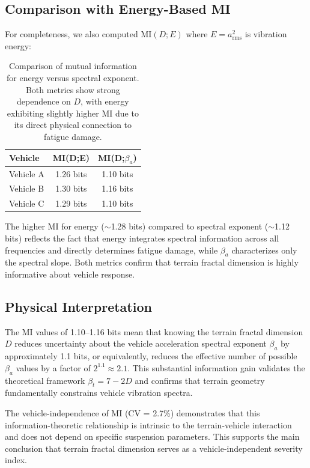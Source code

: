 \documentclass[11pt,letterpaper]{article}
\begin{document}
\subsection{Comparison with Energy-Based MI}

For completeness, we also computed $\text{MI}(D;E)$ where $E = a_{\text{rms}}^2$ is vibration energy:

\begin{table}[h]
\centering
\begin{tabular}{lcc}
\hline
\textbf{Vehicle} & \textbf{MI(D;E)} & \textbf{MI(D;$\beta_a$)} \\
\hline
Vehicle A & 1.26 bits & 1.10 bits \\
Vehicle B & 1.30 bits & 1.16 bits \\
Vehicle C & 1.29 bits & 1.10 bits \\
\hline
\end{tabular}
\caption{Comparison of mutual information for energy versus spectral exponent. Both metrics show strong dependence on $D$, with energy exhibiting slightly higher MI due to its direct physical connection to fatigue damage.}
\end{table}

The higher MI for energy ($\sim$1.28 bits) compared to spectral exponent ($\sim$1.12 bits) reflects the fact that energy integrates spectral information across all frequencies and directly determines fatigue damage, while $\beta_a$ characterizes only the spectral slope. Both metrics confirm that terrain fractal dimension is highly informative about vehicle response.

\subsection{Physical Interpretation}

The MI values of 1.10--1.16 bits mean that knowing the terrain fractal dimension $D$ reduces uncertainty about the vehicle acceleration spectral exponent $\beta_a$ by approximately 1.1 bits, or equivalently, reduces the effective number of possible $\beta_a$ values by a factor of $2^{1.1} \approx 2.1$. This substantial information gain validates the theoretical framework $\beta_t = 7-2D$ and confirms that terrain geometry fundamentally constrains vehicle vibration spectra.

The vehicle-independence of MI (CV = 2.7\%) demonstrates that this information-theoretic relationship is intrinsic to the terrain-vehicle interaction and does not depend on specific suspension parameters. This supports the main conclusion that terrain fractal dimension serves as a vehicle-independent severity index.
\end{document}

